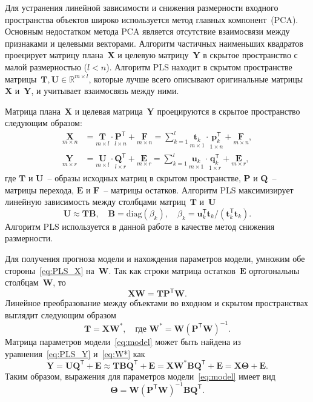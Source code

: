 \documentclass[preprint,12pt]{elsarticle}
\theoremstyle{definition}
\newcommand{\bY}{\mathbf{Y}}
\newcommand{\bX}{\mathbf{X}}
\newcommand{\bu}{\mathbf{u}}
\newcommand{\bt}{\mathbf{t}}
\newcommand{\bp}{\mathbf{p}}
\newcommand{\bq}{\mathbf{q}}
\newcommand{\bP}{\mathbf{P}}
\newcommand{\bT}{\mathbf{T}}
\newcommand{\bB}{\mathbf{B}}
\newcommand{\bQ}{\mathbf{Q}}
\newcommand{\bE}{\mathbf{E}}
\newcommand{\bF}{\mathbf{F}}
\newcommand{\bU}{\mathbf{U}}
\newcommand{\bW}{\mathbf{W}}
\newcommand{\T}{\mathsf{T}}
\newcommand{\bTheta}{\boldsymbol{\Theta}}
\begin{document}
Для устранения линейной зависимости и снижения размерности входного пространства объектов широко используется метод главных компонент~(PCA). 
Основным недостатком метода PCA является отсутствие взаимосвязи между признаками и целевыми векторами.
Алгоритм частичных наименьших квадратов проецирует матрицу плана~$\bX$ и целевую матрицу~$\bY$ в скрытое пространство с малой размерностью ($l < n$).
Алгоритм PLS находит в скрытом пространстве матрицы~$\bT, \bU \in \mathbb{R}^{m \times l}$, которые лучше всего описывают оригинальные матрицы~$\bX$ и~$\bY$, и учитывает взаимосвязь между ними.

Матрица плана~$\bX$ и целевая матрица~$\bY$ проецируются в скрытое пространство следующим образом:
\begin{align}
\label{eq:PLS_X}
\underset{m \times n}{\bX} 
&= \underset{m \times l}{\bT} \cdot \underset{l \times n}{\bP^{\T}} + \underset{m \times n}{\bF} 
= \sum_{k=1}^l \underset{m \times 1}{\bt_k} \cdot \underset{1 \times n}{\bp_k^{\T}} + \underset{m \times n}{\bF},\\
\label{eq:PLS_Y}
\underset{m \times r}{\bY} 
&= \underset{m \times l}{\bU} \cdot \underset{l \times r}{\bQ^{\T}} + \underset{m \times r}{\bE}
=  \sum_{k=1}^l  \underset{m \times 1}{\bu_k} \cdot \underset{1 \times r}{\bq_k^{\T}} +  \underset{m \times r}{\bE},
\end{align}
где $\bT$ и $\bU$~-- образы исходных матриц в скрытом пространстве, $\bP$ и $\bQ$~-- матрицы перехода, $\bE$ и $\bF$~-- матрицы остатков. Алгоритм PLS максимизирует линейную зависимость между столбцами матриц~$\bT$ и~$\bU$
\begin{equation*}
\bU \approx \bT \bB, \quad \bB = \text{diag}(\beta_k), \quad \beta_k = \bu_k^{\T}\bt_k / (\bt_k^{\T}\bt_k).
\end{equation*}
Алгоритм PLS используется в данной работе в качестве метод снижения размерности.

Для получения прогноза модели и нахождения параметров модели, умножим обе стороны~\eqref{eq:PLS_X} на~$\bW$. 
Так как строки матрица остатков~$\bE$ ортогональны столбцам~$\bW$, то
\begin{equation*}
\bX \bW = \bT \bP^{\T} \bW.
\end{equation*}
Линейное преобразование между объектами во входном и скрытом пространствах выглядит следующим образом
\begin{equation}
\bT = \bX \bW^*, \quad \text{где } \bW^* = \bW (\bP^{\T} \bW)^{-1}.
\label{eq:W*}
\end{equation}
Матрица параметров модели~\eqref{eq:model} может быть найдена из уравнения~\eqref{eq:PLS_Y} и~\eqref{eq:W*} как
\begin{equation}
\bY = \bU \bQ^{\T} + \bE \approx \bT \bB \bQ^{\T}+ \bE = \bX \bW^* \bB \bQ^{\T} + \bE = \bX \bTheta + \bE.
\label{eq:pls_model}
\end{equation}
Таким образом, выражения для параметров модели~\eqref{eq:model} имеет вид 
\begin{equation*}
\bTheta = \bW (\bP^{\T} \bW)^{-1} \bB \bQ^{\T}.
\end{equation*}
\end{document}
